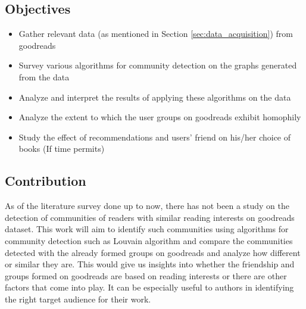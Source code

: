 \documentclass[11pt]{article}
\begin{document}
\subsection{Objectives}

\begin{itemize}
\item[\checkmark] Gather relevant data (as mentioned in Section \ref{sec:data_acquisition}) from goodreads
\item[\checkmark] Survey various algorithms for community detection on the graphs generated from the data
\item[\checkmark] Analyze and interpret the results of applying these algorithms on the data 
\item[\checkmark] Analyze the extent to which the user groups on goodreads exhibit homophily
\item Study the effect of recommendations and users' friend on his/her choice of books (If time permits)
\end{itemize}

\subsection{Contribution}
As of the literature survey done up to now, there has not been a study on the detection of communities of readers with similar reading interests on goodreads dataset.
This work will aim to identify such communities using algorithms for community detection such as Louvain algorithm and compare the communities detected with the already formed groups on goodreads and analyze how different or similar they are.
This would give us insights into whether the friendship and groups formed on goodreads are based on reading interests or there are other factors that come into play. It can be especially useful to authors in identifying the right target audience for their work. \\\\
\end{document}

